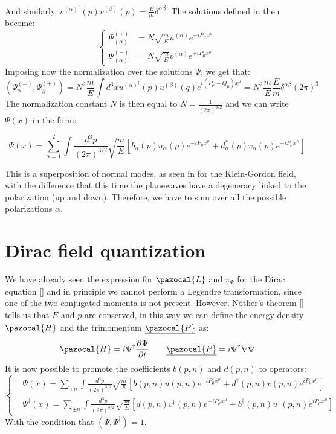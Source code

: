 \documentclass[../main.tex]{subfiles}
\begin{document}
And similarly, $v^{(\alpha)^\dagger}(p)v^{(\beta)}(p)=\frac{E}{m}\delta^{\alpha\beta}$. The solutions defined in  then become:
\[
\left\{
\begin{aligned}
\Psi^{(+)}_{(\alpha)}&=N\sqrt{\frac{m}{E}}u^{(\alpha)}e^{-iP_\mu x^\mu}\\
\Psi^{(-)}_{(\alpha)}&=N\sqrt{\frac{m}{E}}v^{(\alpha)}e^{+iP_\mu x^\mu}
\end{aligned}
\right.
\]
Imposing now the normalization over the solutions $\Psi$, we get that:
\[
(\Psi^{(+)}_\alpha,\Psi^{(+)}_\beta)=N^2\frac{m}{E}\int d^3xu^{(\alpha)^\dagger}(p)u^{(\beta)}(q)e^{i(P_\mu-Q_\mu)x^\mu}=N^2\frac{m}{E}\frac{E}{m}\delta^{\alpha\beta}(2\pi)^3
\]
The normalization constant $N$ is then equal to $N=\frac{1}{(2\pi)^{3/2}}$ and we can write $\Psi(x)$ in the form:
\begin{kaobox}[frametitle=Solution of the Dirac equation]
\[
\Psi(x)=\sum_{\alpha=1}^2\int \frac{d^3p}{(2\pi)^{3/2}}\sqrt{\frac{m}{E}}\left[b_\alpha(p)u_\alpha(p)e^{-iP_\mu x^\mu}+d^*_\alpha(p)v_\alpha(p)e^{+iP_\mu x^\mu}\right]
\]
\end{kaobox}
This is a superposition of normal modes, as seen in  for the Klein-Gordon field, with the difference that this time the planewaves have a degeneracy linked to the polarization (up and down). Therefore, we have to sum over all the possible polarizations $\alpha$.
\section{Dirac field quantization}
We have already seen the expression for $\pazocal{L}$ and $\pi_\Psi$ for the Dirac equation [] and in principle we cannot perform a Legendre transformation, since one of the two conjugated momenta is not present. However, N\"other's theorem [] tells us that $E$ and $\underline{p}$ are conserved, in this way we can define the energy density $\pazocal{H}$ and the trimomentum $\underline{\pazocal{P}}$ as:
\[
\pazocal{H}=i\Psi^\dagger\frac{\partial\Psi}{\partial t} \quad \quad \underline{\pazocal{P}}=i\Psi^\dagger\underline{\nabla}\Psi
\]
It is now possible to promote the coefficients $b(p,n)$ and $d(p,n)$ to operators:
\[
\left\{
\begin{aligned}
&\Psi(x)=\sum_{\pm n}\int\frac{d^3p}{(2\pi)^{3/2}}\sqrt{\frac{m}{E}}\left[b(p,n)u(p,n)e^{-iP_\mu x^\mu}+d^\dagger(p,n)v(p,n)e^{iP_\mu x^\mu}\right]\\
&\Psi^\dagger(x)=\sum_{\pm n}\int\frac{d^3p}{(2\pi)^{3/2}}\sqrt{\frac{m}{E}}\left[d(p,n)v^\dagger(p,n)e^{-iP_\mu x^\mu}+b^\dagger(p,n)u^\dagger(p,n)e^{iP_\mu x^\mu}\right]
\end{aligned}
\right.
\]
With the condition that $(\Psi,\Psi^\dagger)=1$.
\end{document}
